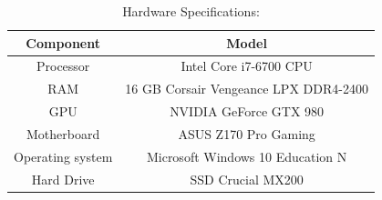 \documentclass[conference]{IEEEtran}
\begin{document}
\begin{table}[htbp]
\begin{center}
\begin{tabular}{|c|c|}
\end{tabular}
\label{softwareVersion}
\end{center}
\end{table}

\begin{table}[htbp]
\caption{Hardware Specifications:}
\begin{center}
\begin{tabular}{|c|c|}
	\hline
	\textbf{Component} & \textbf{Model} \\
	\hline
	Processor & Intel Core i7-6700 CPU\\ \hline
	RAM & 16 GB Corsair Vengeance LPX DDR4-2400\\ \hline
	GPU & NVIDIA GeForce GTX 980 \\ \hline
	Motherboard & ASUS Z170 Pro Gaming \\ \hline
	Operating system & Microsoft Windows 10 Education N \\ \hline
	Hard Drive & SSD Crucial MX200 \\ \hline
\end{tabular}
\label{hardware}
\end{center}
\end{table}
\end{document}

